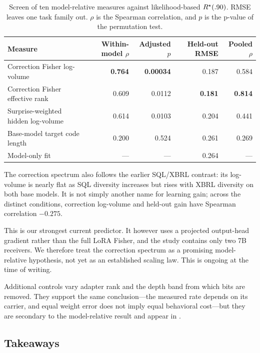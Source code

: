 \begin{table}[!htbp]
\centering\small
\setlength{\tabcolsep}{5pt}
\begin{tabular}{lrrrr}
\toprule
Measure & Within-model $\rho$ & Adjusted $p$ & Held-out RMSE & Pooled $\rho$ \\
\midrule
Correction Fisher log-volume & \textbf{0.764} & \textbf{0.00034} & 0.187 & 0.584 \\
Correction Fisher effective rank & 0.609 & 0.0112 & \textbf{0.181} & \textbf{0.814} \\
Surprise-weighted hidden log-volume & 0.614 & 0.0103 & 0.204 & 0.441 \\
Base-model target code length & 0.200 & 0.524 & 0.261 & 0.269 \\
Model-only fit & --- & --- & 0.264 & --- \\
\bottomrule
\end{tabular}
\caption[Screen of model-relative dataset-information measures.]{Screen of ten model-relative measures against likelihood-based $R^{\star}(.90)$. RMSE leaves one task family out. $\rho$ is the Spearman correlation, and $p$ is the p-value of the permutation test.}
\label{tab:relative-info-screen}
\end{table}

The correction spectrum also follows the earlier SQL/XBRL contrast: its log-volume is nearly flat as SQL diversity increases but rises with XBRL diversity on both base models. It is not simply another name for learning gain; across the distinct conditions, correction log-volume and held-out gain have Spearman correlation $-0.275$.

This is our strongest current predictor. It however uses a projected output-head gradient rather than the full LoRA Fisher, and the study contains only two 7B receivers. We therefore treat the correction spectrum as a promising model-relative hypothesis, not yet as an established scaling law. This is ongoing at the time of writing.

Additional controls vary adapter rank and the depth band from which bits are removed. They support the same conclusion---the measured rate depends on its carrier, and equal weight error does not imply equal behavioral cost---but they are secondary to the model-relative result and appear in .

\FloatBarrier
\subsection{Takeaways}

